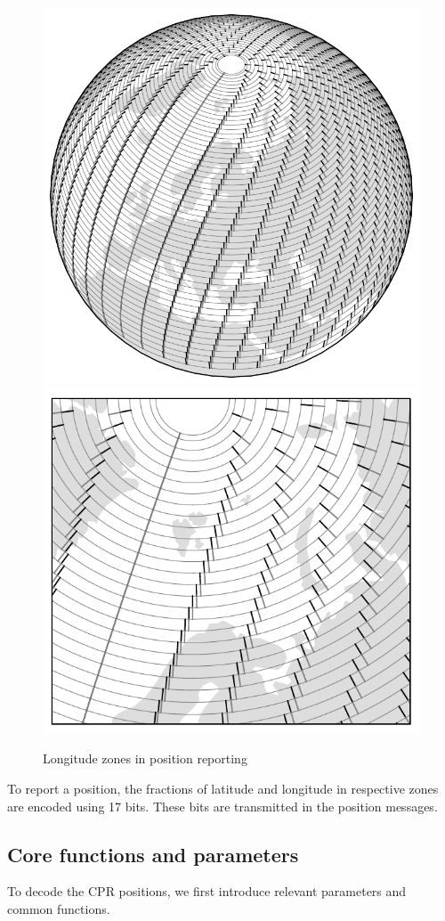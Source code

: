 \begin{figure}
  \includegraphics[width=0.7\linewidth]{figures/adsb/cpr_lon_zone_full.pdf}
  \vspace{0.5cm}
  \includegraphics[width=0.7\linewidth]{figures/adsb/cpr_lon_zone_zoom.pdf}
  \caption{Longitude zones in position reporting}
  \label{fig:cpr_lon_zones}
\end{figure}

To report a position, the fractions of latitude and longitude in respective zones are encoded using 17 bits. These bits are transmitted in the position messages.


\subsection{Core functions and parameters}
To decode the CPR positions, we first introduce relevant parameters and common functions.

